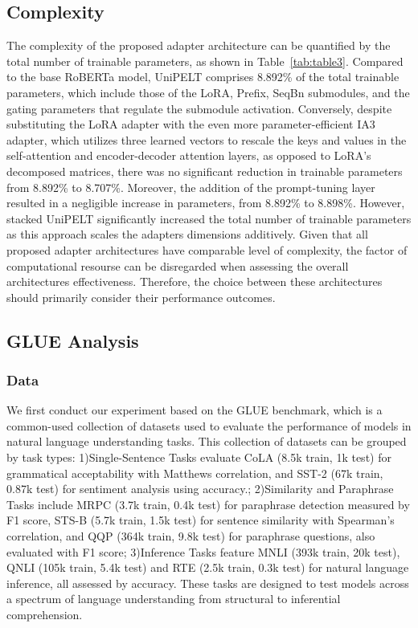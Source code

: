 \documentclass[10pt,twocolumn,letterpaper]{article}
\begin{document}
\subsection{Complexity}
The complexity of the proposed adapter architecture can be quantified by the total number of trainable parameters, as shown in Table~\ref{tab:table3}. Compared to the base RoBERTa model, UniPELT comprises 8.892\% of the total trainable parameters, which include those of the LoRA, Prefix, SeqBn submodules, and the gating parameters that regulate the submodule activation. Conversely, despite substituting the LoRA adapter with the even more parameter-efficient IA3 adapter, which utilizes three learned vectors to rescale the keys and values in the self-attention and encoder-decoder attention layers, as opposed to LoRA's decomposed matrices, there was no significant reduction in trainable parameters from 8.892\% to 8.707\%. Moreover, the addition of the prompt-tuning layer resulted in a negligible increase in parameters, from 8.892\% to 8.898\%. However, stacked UniPELT significantly increased the total number of trainable parameters as this approach scales the adapters dimensions additively. Given that all proposed adapter architectures have comparable level of complexity, the factor of computational resourse can be disregarded when assessing the overall architectures effectiveness. Therefore, the choice between these architectures should primarily consider their performance outcomes.

\subsection{GLUE Analysis}
\subsubsection{Data}

We first conduct our experiment based on the GLUE benchmark, which is a common-used collection of datasets used to evaluate the performance of models in natural language understanding tasks. This collection of datasets can be grouped by task types: 1)Single-Sentence Tasks evaluate CoLA (8.5k train, 1k test) for grammatical acceptability with Matthews correlation, and SST-2 (67k train, 0.87k test) for sentiment analysis using accuracy.; 2)Similarity and Paraphrase Tasks include MRPC (3.7k train, 0.4k test) for paraphrase detection measured by F1 score, STS-B (5.7k train, 1.5k test) for sentence similarity with Spearman's correlation, and QQP (364k train, 9.8k test) for paraphrase questions, also evaluated with F1 score; 3)Inference Tasks feature MNLI (393k train, 20k test), QNLI (105k train, 5.4k test) and RTE (2.5k train, 0.3k test) for natural language inference, all assessed by accuracy. These tasks are designed to test models across a spectrum of language understanding from structural to inferential comprehension.
\end{document}
